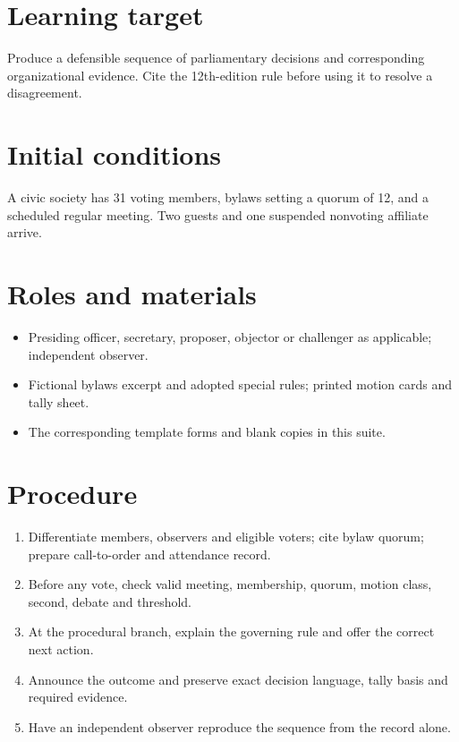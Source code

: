 \documentclass[11pt]{article}
\begin{document}
\SuiteOpen
\section{Learning target}
Produce a defensible sequence of parliamentary decisions and corresponding organizational evidence. Cite the 12th-edition rule before using it to resolve a disagreement.

\section{Initial conditions}
A civic society has 31 voting members, bylaws setting a quorum of 12, and a scheduled regular meeting. Two guests and one suspended nonvoting affiliate arrive.

\section{Roles and materials}
\begin{itemize}[leftmargin=*,itemsep=4pt]
\item Presiding officer, secretary, proposer, objector or challenger as applicable; independent observer.
\item Fictional bylaws excerpt and adopted special rules; printed motion cards and tally sheet.
\item The corresponding template forms and blank copies in this suite.
\end{itemize}

\section{Procedure}
\begin{enumerate}[leftmargin=*,itemsep=4pt]
\item Differentiate members, observers and eligible voters; cite bylaw quorum; prepare call-to-order and attendance record.
\item Before any vote, check valid meeting, membership, quorum, motion class, second, debate and threshold.
\item At the procedural branch, explain the governing rule and offer the correct next action.
\item Announce the outcome and preserve exact decision language, tally basis and required evidence.
\item Have an independent observer reproduce the sequence from the record alone.
\end{enumerate}
\end{document}
